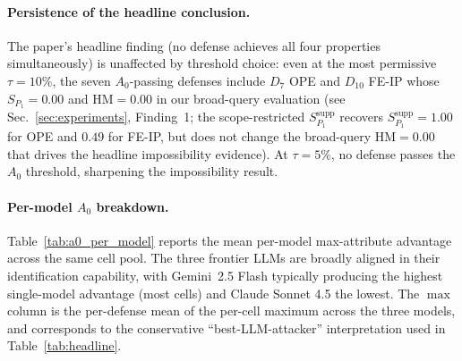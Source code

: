 \documentclass{article}
\theoremstyle{remark}
\begin{document}
\paragraph{Persistence of the headline conclusion.} The paper's headline finding (no defense achieves all four properties simultaneously) is unaffected by threshold choice: even at the most permissive $\tau = 10\%$, the seven $A_0$-passing defenses include $D_7$ OPE and $D_{10}$ FE-IP whose $S_{P_1} = 0.00$ and $\mathrm{HM} = 0.00$ in our broad-query evaluation (see Sec.~\ref{sec:experiments}, Finding~1; the scope-restricted $S_{P_1}^{\text{supp}}$ recovers $S_{P_1}^{\text{supp}} = 1.00$ for OPE and $0.49$ for FE-IP, but does not change the broad-query $\mathrm{HM} = 0.00$ that drives the headline impossibility evidence). At $\tau = 5\%$, no defense passes the $A_0$ threshold, sharpening the impossibility result.

\paragraph{Per-model $A_0$ breakdown.} Table~\ref{tab:a0_per_model} reports the mean per-model max-attribute advantage across the same cell pool. The three frontier LLMs are broadly aligned in their identification capability, with Gemini~2.5 Flash typically producing the highest single-model advantage (most cells) and Claude Sonnet 4.5 the lowest. The $\max$ column is the per-defense mean of the per-cell maximum across the three models, and corresponds to the conservative ``best-LLM-attacker'' interpretation used in Table~\ref{tab:headline}.
\end{document}
